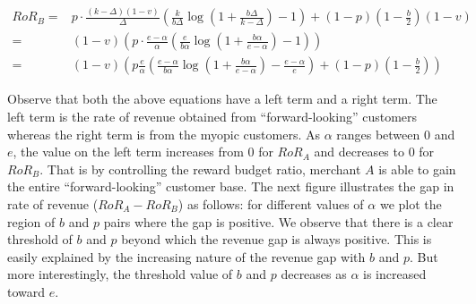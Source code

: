 \begin{align*}
RoR_B =& p\cdot\frac{(k-\Delta)(1-v)}{\Delta}\left(\frac{k}{b\Delta}\log\left(1+\frac{b\Delta}{k-\Delta}\right) - 1\right) + (1-p)(1-\frac{b}{2})(1-v)\\
      =& (1-v)\left(p\cdot\frac{e-\alpha}{\alpha}\left(\frac{e}{b\alpha}\log\left(1+\frac{b\alpha}{e-\alpha}\right) - 1\right)\right)\\
      =& (1-v)\left(p\frac{e}{\alpha}\left(\frac{e-\alpha}{b\alpha}\log\left(1+\frac{b\alpha}{e-\alpha}\right) - \frac{e-\alpha}{e}\right) + (1-p)(1-\frac{b}{2})\right)
\end{align*}

Observe that both the above equations have a left term and a right term. The left term is the rate of revenue obtained from ``forward-looking'' customers whereas the right term is from the myopic customers.
As $\alpha$ ranges between $0$ and $e$, the value on the left term increases from $0$ for $RoR_A$ and decreases to $0$ for $RoR_B$.
That is by controlling the reward budget ratio, merchant $A$ is able to gain the entire ``forward-looking'' customer base.
The next figure illustrates the gap in rate of revenue ($RoR_A - RoR_B$) as follows: for different values of $\alpha$ we plot the region of $b$ and $p$ pairs where the gap is positive.
We observe that there is a clear threshold of $b$ and $p$ beyond which the revenue gap is always positive.
This is easily explained by the increasing nature of the revenue gap with $b$ and $p$.
But more interestingly, the threshold value of $b$ and $p$ decreases as $\alpha$ is increased toward $e$.

